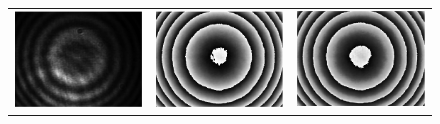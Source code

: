 \documentclass[letterpaper,12pt]{article}   %
\begin{document}
\begin{figure}[h t]
  \begin{center}
    \begin{tabular}{c c c}
      \includegraphics[scale=0.25]{figures/InterferogramaExpMod.png}}&
    \includegraphics[scale=0.25]{figures/faseExpRST.png}}&
  \includegraphics[scale=0.25]{figures/faseExpAIA.png}}& \\

\end{tabular}
\end{center}
\end{figure}
\end{document}
